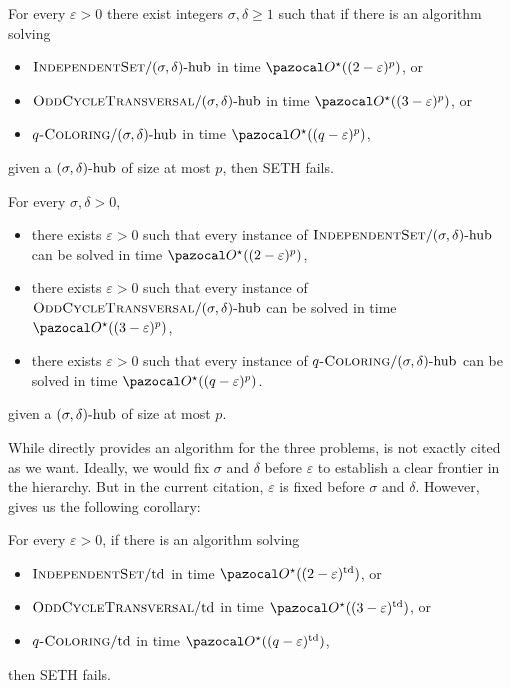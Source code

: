 \begin{theorem}
    \label{theorem:sdhub-lowerbounds}
    For every $\varepsilon > 0$ there exist integers $\sigma, \delta \geq 1$ such that if there is an algorithm solving
    \begin{itemize}
        \item $\textsc{IndependentSet}/(\sigma, \delta)\text{-hub}$ in time $\O^\star((2 - \varepsilon)^p)$, or
        \item $\textsc{OddCycleTransversal}/(\sigma, \delta)\text{-hub}$ in time $\O^\star((3 - \varepsilon)^p)$, or
        \item $q\textsc{-Coloring}/(\sigma, \delta)\text{-hub}$ in time $\O^\star((q - \varepsilon)^p)$,
    \end{itemize}
    given a $(\sigma, \delta)\text{-hub}$ of size at most $p$, then SETH fails.
\end{theorem}

\begin{theorem}
    \label{theorem:sdhub-upperbounds}
    For every $\sigma, \delta > 0$, 
    \begin{itemize}
        \item there exists $\varepsilon > 0$ such that every instance of $\textsc{IndependentSet}/(\sigma, \delta)\text{-hub}$ can be solved in time $\O^\star((2 - \varepsilon)^p)$,
        \item there exists $\varepsilon > 0$ such that every instance of $\textsc{OddCycleTransversal}/(\sigma, \delta)\text{-hub}$ can be solved in time $\O^\star((3 - \varepsilon)^p)$,
        \item there exists $\varepsilon > 0$ such that every instance of $q\textsc{-Coloring}/(\sigma, \delta)\text{-hub}$ can be solved in time $\O^\star((q - \varepsilon)^p)$.
    \end{itemize}
    given a $(\sigma, \delta)\text{-hub}$ of size at most $p$.
\end{theorem}

While  directly provides an algorithm for the three problems,  is not exactly cited as we want. Ideally, we would fix $\sigma$ and $\delta$ before $\varepsilon$ to establish a clear frontier in the hierarchy. But in the current citation, $\varepsilon$ is fixed before $\sigma$ and $\delta$. However,  gives us the following corollary:

\begin{corollary}
    \label{corollary:td-lowerbounds}
    For every $\varepsilon > 0$, if there is an algorithm solving
    \begin{itemize}
        \item $\textsc{IndependentSet}/\text{td}$ in time $\O^\star((2 - \varepsilon)^\td)$, or
        \item $\textsc{OddCycleTransversal}/\text{td}$ in time $\O^\star((3 - \varepsilon)^\td)$, or
        \item $q\textsc{-Coloring}/\text{td}$ in time $\O^\star((q - \varepsilon)^\td)$,
    \end{itemize}
    then SETH fails.
\end{corollary}

